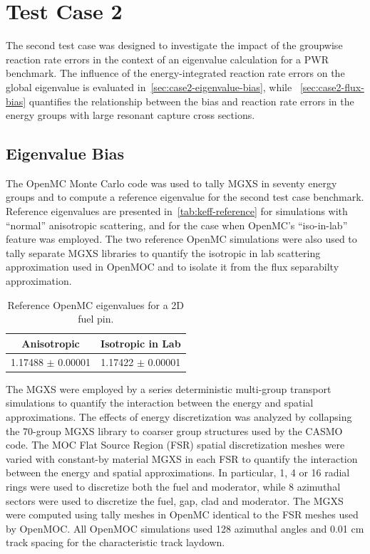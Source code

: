 \section{Test Case 2}
\label{sec:test-case2}

The second test case was designed to investigate the impact of the groupwise reaction rate errors in the context of an eigenvalue calculation for a PWR benchmark. The influence of the energy-integrated reaction rate errors on the global eigenvalue is evaluated in~\autoref{sec:case2-eigenvalue-bias}, while ~\autoref{sec:case2-flux-bias} quantifies the relationship between the bias and reaction rate errors in the energy groups with large resonant capture cross sections.

\subsection{Eigenvalue Bias}
\label{sec:case2-eigenvalue-bias}

The OpenMC Monte Carlo code was used to tally MGXS in seventy energy groups and to compute a reference eigenvalue for the second test case benchmark. Reference eigenvalues are presented in~\autoref{tab:keff-reference} for simulations with ``normal'' anisotropic scattering, and for the case when OpenMC's ``iso-in-lab'' feature was employed. The two reference OpenMC simulations were also used to tally separate MGXS libraries to quantify the isotropic in lab scattering approximation used in OpenMOC and to isolate it from the flux separabilty approximation.

\begin{table}[h!]
  \centering
  \caption{Reference OpenMC eigenvalues for a 2D fuel pin.}
  \label{tab:keff-reference} 
  \begin{tabular}{c c}
  \toprule
  {\bf Anisotropic} &
  {\bf Isotropic in Lab} \\
  \midrule
  1.17488 $\pm$ 0.00001 & 1.17422 $\pm$ 0.00001 \\
  \bottomrule
\end{tabular}
\end{table}

The MGXS were employed by a series deterministic multi-group transport simulations to quantify the interaction between the energy and spatial approximations. The effects of energy discretization was analyzed by collapsing the 70-group MGXS library to coarser group structures used by the CASMO code. The MOC Flat Source Region (FSR) spatial discretization meshes were varied with constant-by material MGXS in each FSR to quantify the interaction between the energy and spatial approximations. In particular, 1, 4 or 16 radial rings were used to discretize both the fuel and moderator, while 8 azimuthal sectors were used to discretize the fuel, gap, clad and moderator. The MGXS were computed using tally meshes in OpenMC identical to the FSR meshes used by OpenMOC. All OpenMOC simulations used 128 azimuthal angles and 0.01 cm track spacing for the characteristic track laydown.

